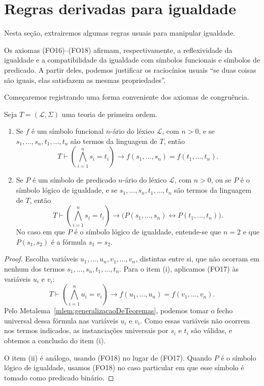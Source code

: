 \section{Regras derivadas para igualdade}\label{sec:regrasDerivadasParaIgualdade}

Nesta seção, extrairemos algumas regras usuais para manipular igualdade.

Os axiomas (FO16)--(FO18) afirmam, respectivamente, a reflexividade da igualdade e a compatibilidade da igualdade com símbolos funcionais e símbolos de predicado.
A partir deles, podemos justificar os raciocínios usuais ``se duas coisas são iguais, elas satisfazem as mesmas propriedades''.

Começaremos registrando uma forma conveniente dos axiomas de congruência.

\begin{metalemma}\label{mlem:congruenciaComTermos}
    Seja $T=(\mathcal L,\Sigma)$ uma teoria de primeira ordem.

    \begin{enumerate}[label=(\roman*)]
        \item Se $f$ é um símbolo funcional $n$-ário do léxico $\mathcal L$, com $n>0$, e se $s_1,\dots,s_n,t_1,\dots,t_n$ são termos da linguagem de $T$, então
        \[
            T\vdash
            \left(\bigwedge_{i=1}^n s_i=t_i\right)
            \rightarrow
            f(s_1,\dots,s_n)=f(t_1,\dots,t_n).
        \]

        \item Se $P$ é um símbolo de predicado $n$-ário do léxico $\mathcal L$, com $n>0$, ou se $P$ é o símbolo lógico de igualdade, e se $s_1,\dots,s_n,t_1,\dots,t_n$ são termos da linguagem de $T$, então
        \[
            T\vdash
            \left(\bigwedge_{i=1}^n s_i=t_i\right)
            \rightarrow
            \bigl(P(s_1,\dots,s_n)\leftrightarrow P(t_1,\dots,t_n)\bigr).
        \]
        No caso em que $P$ é o símbolo lógico de igualdade, entende-se que $n=2$ e que $P(s_1,s_2)$ é a fórmula $s_1=s_2$.
    \end{enumerate}
\end{metalemma}

\begin{proof}
    Escolha variáveis $u_1,\dots,u_n,v_1,\dots,v_n$, distintas entre si, que não ocorram em nenhum dos termos $s_1,\dots,s_n,t_1,\dots,t_n$.
    Para o item (i), aplicamos (FO17) às variáveis $u_i$ e $v_i$:
    \[
        T\vdash
        \left(\bigwedge_{i=1}^n u_i=v_i\right)
        \rightarrow
        f(u_1,\dots,u_n)=f(v_1,\dots,v_n).
    \]
    Pelo Metalema~\ref{mlem:generalizacaoDeTeoremas}, podemos tomar o fecho universal dessa fórmula nas variáveis $u_i$ e $v_i$.
    Como essas variáveis não ocorrem nos termos indicados, as instanciações universais por $s_i$ e $t_i$ são válidas, e obtemos a conclusão do item (i).

    O item (ii) é análogo, usando (FO18) no lugar de (FO17).
    Quando $P$ é o símbolo lógico de igualdade, usamos (FO18) no caso particular em que esse símbolo é tomado como predicado binário.
\end{proof}

